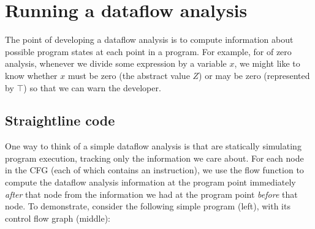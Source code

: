\documentclass[11pt]{article}
\begin{document}

\section{Running a dataflow analysis}

The point of developing a dataflow analysis is to compute information about
possible program states at each point in a program.  For example, for
of zero analysis, whenever we divide some expression by a variable $x$, we might
like to know whether $x$ must be zero (the abstract value $Z$) or
may be zero (represented by $\top$) so that we can warn the developer.

\subsection{Straightline code}

One way to think of a simple dataflow analysis is that are statically simulating
program execution, tracking only the information we care about.  For each node in the CFG (each of which contains an
instruction), we use the flow function to compute the dataflow analysis
information at the program point immediately \emph{after} that node
from the information we had at the program point \emph{before} that node.
To demonstrate, consider the following simple program (left), with its control flow graph (middle):
\end{document}
